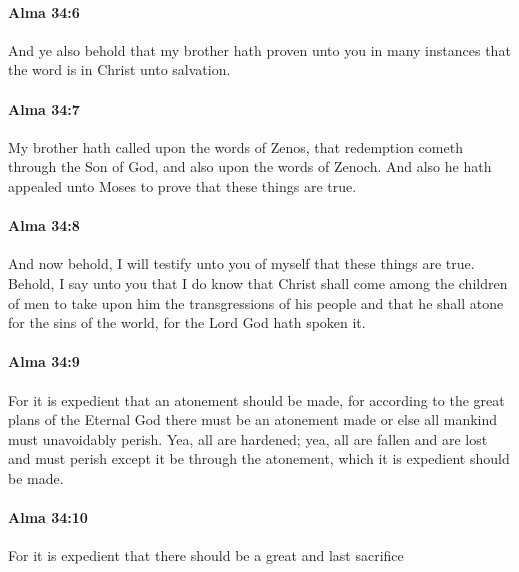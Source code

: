 		\paragraph{Alma 34:6} %
			\label{ALMA-34-6}

			And ye also behold that my brother hath proven unto you in many instances
			that the word is in Christ unto salvation.

		\paragraph{Alma 34:7} %
			\label{ALMA-34-7}

			My brother hath called upon the words of Zenos,
			that redemption cometh through the Son of God,
			and also upon the words of Zenoch.
			And also he hath appealed unto Moses to prove that these things are true.

		\paragraph{Alma 34:8} %
			\label{ALMA-34-8}

			And now behold, I will testify unto you of myself that these things are true.
			Behold, I say unto you that I do know
			that Christ shall come among the children of men
			to take upon him the transgressions of his people
			and that he shall atone for the sins of the world,
			for the Lord God hath spoken it.

		\paragraph{Alma 34:9} %
			\label{ALMA-34-9}

			For it is expedient that an atonement should be made,
			for according to the great plans of the Eternal God
			there must be an atonement made or else all mankind must unavoidably perish.
			Yea, all are hardened;
			yea, all are fallen and are lost and must perish
			except it be through the atonement, which it is expedient should be made.

		\paragraph{Alma 34:10} %
			\label{ALMA-34-10}

			For it is expedient that there should be a great and last sacrifice


